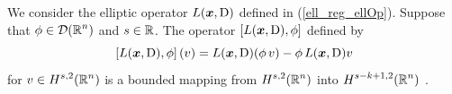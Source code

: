 \begin{lemma} \label{ell_reg_in_lem1}
We consider the elliptic operator $L({\bm{x}},\operatorname{D})$ defined in
(\ref{ell_reg_ellOp}).  Suppose that $\displaystyle \phi \in \mathcal{D}(\mathbb{R}^n)$
and $s\in \mathbb{R}$.
The operator $\left[ L({\bm{x}},\operatorname{D}), \phi\right]$ defined by
\[
\left[ L({\bm{x}},\operatorname{D}), \phi\right](v)
= L({\bm{x}},\operatorname{D}) (\phi\, v) - \phi\, L({\bm{x}},\operatorname{D}) v
\]
for $\displaystyle v \in H^{s,2}(\mathbb{R}^n)$ is a bounded mapping from
$\displaystyle H^{s,2}(\mathbb{R}^n)$ into $\displaystyle H^{s-k+1,2}(\mathbb{R}^n)$
\footnotemark.
\end{lemma}


